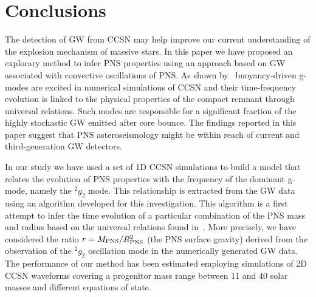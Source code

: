 \section{Conclusions}
\label{sec:conclusion}

The detection of GW from CCSN may help improve our current understanding of the explosion mechanism of massive stars.  
In this paper we have proposed an explorary method to infer PNS properties using an approach based on GW associated with convective oscillations of PNS. As shown by~\cite{Torres:2019b} buoyancy-driven g-modes are excited in numerical simulations of CCSN and their time-frequency evolution is linked to the physical properties of the compact remnant through universal relations. Such modes are responsible for a significant fraction of the highly stochastic GW emitted after core bounce. The findings reported in this paper suggest that PNS asteroseismology might be within reach of current and third-generation GW detectors.

In our study we have used a set of 1D CCSN simulations to build a model that relates the  evolution of PNS properties with the frequency of the dominant g-mode, namely the $\mbox{}^2g_2$ mode. This relationship is extracted from the GW data using an algorithm developed for this investigation. This algorithm is  a first attempt to infer the time evolution of a particular combination of the PNS mass and radius based on the universal relations found in~\cite{Torres:2019b}. More precisely, we have considered the ratio $r=M_{\rm PNS}/R_{\rm PNS}^2$ (the PNS surface gravity) derived from the observation of the $\mbox{}^2g_2$ oscillation mode in the numerically generated GW data. The  performance of our method has been estimated employing  simulations of 2D CCSN waveforms covering a progenitor mass range between 11 and 40 solar masses and different equations of state. 

